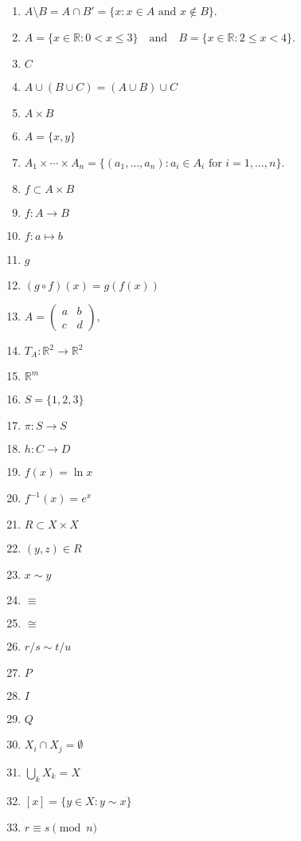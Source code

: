\documentclass[oneside,10pt,]{article}
\newcommand{\lt}{<}
\begin{document}
\begin{enumerate}
\item{}\(A \setminus B = A \cap B'  = \{ x : x \in A \text{ and } x \notin B \}\text{.}\)%
\item{}\(A = \{ x \in {\mathbb R} : 0 \lt x \leq 3 \} \quad \text{and} \quad B = \{ x \in {\mathbb R} : 2 \leq x \lt 4 \}\text{.}\)%
\item{}\(C\)%
\item{}\(A \cup (B \cup C) = (A \cup B) \cup C\)%
\item{}\(A \times B\)%
\item{}\(A = \{ x, y \}\)%
\item{}\(A_1 \times \cdots \times A_n = \{ (a_1, \ldots, a_n): a_i \in A_i \text{ for } i = 1, \ldots, n \}\text{.}\)%
\item{}\(f \subset A \times B\)%
\item{}\(f:A \rightarrow B\)%
\item{}\(f : a \mapsto b\)%
\item{}\(g\)%
\item{}\((g \circ f)(x) = g(f(x))\)%
\item{}\(A =
\begin{pmatrix}
a & b \\
c & d
\end{pmatrix}\text{,}\)%
\item{}\(T_A : {\mathbb R}^2 \rightarrow {\mathbb R}^2\)%
\item{}\({\mathbb R}^m\)%
\item{}\(S = \{ 1,2,3  \}\)%
\item{}\(\pi :S\rightarrow S\)%
\item{}\(h : C \rightarrow D\)%
\item{}\(f(x) = \ln x\)%
\item{}\(f^{-1}(x) = e^x\)%
\item{}\(R \subset X \times X\)%
\item{}\((y, z) \in R\)%
\item{}\(x \sim y\)%
\item{}\(\equiv\)%
\item{}\(\cong\)%
\item{}\(r/s \sim t/u\)%
\item{}\(P\)%
\item{}\(I\)%
\item{}\(Q\)%
\item{}\(X_i \cap X_j = \emptyset\)%
\item{}\(\bigcup_k X_k = X\)%
\item{}\([x] = \{ y \in X : y \sim x \}\)%
\item{}\(r \equiv s \pmod{n}\)%

\end{enumerate}
\end{document}
